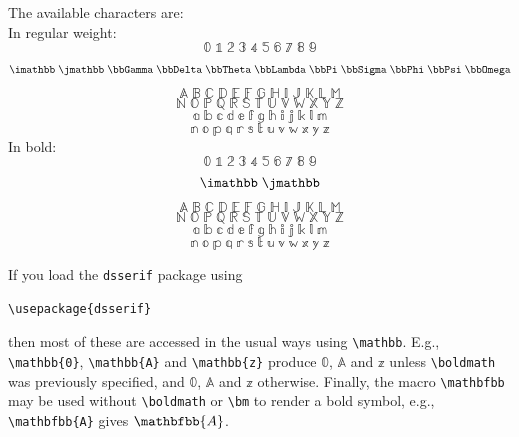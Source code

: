 \documentclass[11pt]{article}
\begin{document}
The available characters are:\\
In regular weight:
\[\mathbb{0}\;\mathbb{1}\;\mathbb{2}\;\mathbb{3}\;\mathbb{4}\;\mathbb{5}\;\mathbb{6}\;\mathbb{7}\;\mathbb{8}\;\mathbb{9}\]
\[\imathbb\;\jmathbb \;\bbGamma\;\bbDelta\;\bbTheta\;\bbLambda\;\bbPi\;\bbSigma\;\bbPhi\;\bbPsi\;\bbOmega
\]
\[{\mathbb{A}}\;{\mathbb{B}}\;{\mathbb{C}}\;{\mathbb{D}}\;{\mathbb{E}}\;{\mathbb{F}}\;{\mathbb{G}}\;{\mathbb{H}}\;{\mathbb{I}}\;{\mathbb{J}}\;{\mathbb{K}}\;{\mathbb{L}}\;{\mathbb{M}}\]
\[{\mathbb{N}}\;{\mathbb{O}}\;{\mathbb{P}}\;{\mathbb{Q}}\;{\mathbb{R}}\;{\mathbb{S}}\;{\mathbb{T}}\;{\mathbb{U}}\;{\mathbb{V}}\;{\mathbb{W}}\;{\mathbb{X}}\;{\mathbb{Y}}\;{\mathbb{Z}}\]
\[{\mathbb{a}}\;{\mathbb{b}}\;{\mathbb{c}}\;{\mathbb{d}}\;{\mathbb{e}}\;{\mathbb{f}}\;{\mathbb{g}}\;{\mathbb{h}}\;{\mathbb{i}}\;{\mathbb{j}}\;{\mathbb{k}}\;{\mathbb{l}}\;{\mathbb{m}}\]
\[{\mathbb{n}}\;{\mathbb{o}}\;{\mathbb{p}}\;{\mathbb{q}}\;{\mathbb{r}}\;{\mathbb{s}}\;{\mathbb{t}}\;{\mathbb{u}}\;{\mathbb{v}}\;{\mathbb{w}}\;{\mathbb{x}}\;{\mathbb{y}}\;{\mathbb{z}}\]
In bold:
{\boldmath
\[\mathbb{0}\;\mathbb{1}\;\mathbb{2}\;\mathbb{3}\;\mathbb{4}\;\mathbb{5}\;\mathbb{6}\;\mathbb{7}\;\mathbb{8}\;\mathbb{9}\]
\[\imathbb\;\jmathbb\]
\[{\mathbb{A}}\;{\mathbb{B}}\;{\mathbb{C}}\;{\mathbb{D}}\;{\mathbb{E}}\;{\mathbb{F}}\;{\mathbb{G}}\;{\mathbb{H}}\;{\mathbb{I}}\;{\mathbb{J}}\;{\mathbb{K}}\;{\mathbb{L}}\;{\mathbb{M}}\]
\[{\mathbb{N}}\;{\mathbb{O}}\;{\mathbb{P}}\;{\mathbb{Q}}\;{\mathbb{R}}\;{\mathbb{S}}\;{\mathbb{T}}\;{\mathbb{U}}\;{\mathbb{V}}\;{\mathbb{W}}\;{\mathbb{X}}\;{\mathbb{Y}}\;{\mathbb{Z}}\]
\[{\mathbb{a}}\;{\mathbb{b}}\;{\mathbb{c}}\;{\mathbb{d}}\;{\mathbb{e}}\;{\mathbb{f}}\;{\mathbb{g}}\;{\mathbb{h}}\;{\mathbb{i}}\;{\mathbb{j}}\;{\mathbb{k}}\;{\mathbb{l}}\;{\mathbb{m}}\]
\[{\mathbb{n}}\;{\mathbb{o}}\;{\mathbb{p}}\;{\mathbb{q}}\;{\mathbb{r}}\;{\mathbb{s}}\;{\mathbb{t}}\;{\mathbb{u}}\;{\mathbb{v}}\;{\mathbb{w}}\;{\mathbb{x}}\;{\mathbb{y}}\;{\mathbb{z}}\]}

If you load the {\tt dsserif} package using
\begin{verbatim}
\usepackage{dsserif}
\end{verbatim}
then
most of these are accessed in the usual ways using \verb|\mathbb|. E.g., \verb|\mathbb{0}|, \verb|\mathbb{A}| and \verb|\mathbb{z}| produce $\mathbb{0}$, $\mathbb{A}$ and $\mathbb{z}$ unless \verb|\boldmath| was previously specified, and {\boldmath $\mathbb{0}$, $\mathbb{A}$ and $\mathbb{z}$} otherwise. Finally, the macro \verb|\mathbfbb| may be used without \verb|\boldmath| or \verb|\bm| to render a bold symbol, e.g., \verb|\mathbfbb{A}| gives $\mathbfbb{A}$.
\end{document}
